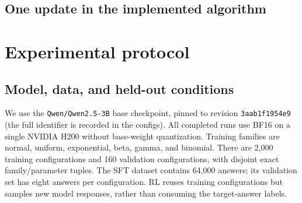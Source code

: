 \documentclass[11pt,letterpaper]{article}
\begin{document}
\subsection{One update in the implemented algorithm}
\noindent{}

\section{Experimental protocol}
\subsection{Model, data, and held-out conditions}
We use the \texttt{Qwen/Qwen2.5-3B} base checkpoint, pinned to revision
\texttt{3aab1f1954e9} (the full identifier is recorded in the configs).
All completed runs use BF16 on a single NVIDIA H200 without base-weight
quantization. Training families are normal, uniform, exponential, beta,
gamma, and binomial. There are 2,000 training configurations and 160
validation configurations, with disjoint exact family/parameter tuples.
The SFT dataset contains 64,000 answers; its validation set has eight answers
per configuration. RL reuses training configurations but samples new model
responses, rather than consuming the target-answer labels.
\end{document}
